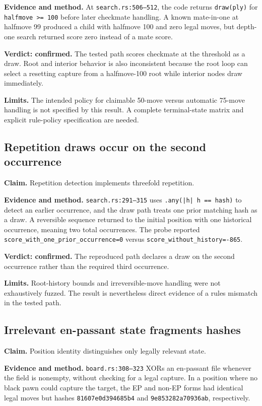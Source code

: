 \documentclass[conference]{IEEEtran}
\newcommand{\code}[1]{\texttt{\small #1}}
\begin{document}
\textbf{Evidence and method.} At \code{search.rs:506--512}, the code returns \code{draw(ply)} for \code{halfmove >= 100} before later checkmate handling. A known mate-in-one at halfmove 99 produced a child with halfmove 100 and zero legal moves, but depth-one search returned score zero instead of a mate score.

\textbf{Verdict: confirmed.} The tested path scores checkmate at the threshold as a draw. Root and interior behavior is also inconsistent because the root loop can select a resetting capture from a halfmove-100 root while interior nodes draw immediately.

\textbf{Limits.} The intended policy for claimable 50-move versus automatic 75-move handling is not specified by this result. A complete terminal-state matrix and explicit rule-policy specification are needed.

\subsection{Repetition draws occur on the second occurrence}
\textbf{Claim.} Repetition detection implements threefold repetition.

\textbf{Evidence and method.} \code{search.rs:291--315} uses \code{.any(|h| h == hash)} to detect an earlier occurrence, and the draw path treats one prior matching hash as a draw. A reversible sequence returned to the initial position with one historical occurrence, meaning two total occurrences. The probe reported \code{score\_with\_one\_prior\_occurrence=0} versus \code{score\_without\_history=-865}.

\textbf{Verdict: confirmed.} The reproduced path declares a draw on the second occurrence rather than the required third occurrence.

\textbf{Limits.} Root-history bounds and irreversible-move handling were not exhaustively fuzzed. The result is nevertheless direct evidence of a rules mismatch in the tested path.

\subsection{Irrelevant en-passant state fragments hashes}
\textbf{Claim.} Position identity distinguishes only legally relevant state.

\textbf{Evidence and method.} \code{board.rs:308--323} XORs an en-passant file whenever the field is nonempty, without checking for a legal capture. In a position where no black pawn could capture the target, the EP and non-EP forms had identical legal moves but hashes \code{81607e0d394685b4} and \code{9e853282a70936ab}, respectively.
\end{document}
